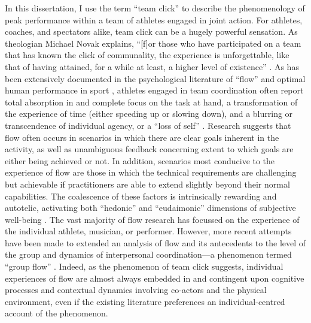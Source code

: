 In this dissertation, I use the term ``team click'' to describe the phenomenology of peak performance within a team of athletes engaged in joint action.  For athletes, coaches, and spectators alike, team click can be a hugely powerful sensation. As theologian Michael Novak explains, ``[f]or those who have participated on a team that has known the click of communality, the experience is unforgettable, like that of having attained, for a while at least, a higher level of existence'' \citep[11]{White2011}. As has been extensively documented in the psychological literature of ``flow'' \citep{Csikszentmihalyi1992} and optimal human performance in sport \citep{Jackson1999}, athletes engaged in team coordination often report total absorption in and complete focus on the task at hand, a transformation of the experience of time (either speeding up or slowing down), and a blurring or transcendence of individual agency, or a ``loss of self''   \citep{Csikszentmihalyi1992,Jackson1995,Jackson1999,McNeill1995}.  Research suggests that flow often occurs in scenarios in which there are clear goals inherent in the activity, as well as unambiguous feedback concerning extent to which goals are either being achieved or not.
In addition, scenarios most conducive to the experience of flow are those in which the technical requirements are challenging but achievable if practitioners are able to extend slightly beyond their normal capabilities\citep{Fong2015}.
The coalescence of these factors is intrinsically rewarding and autotelic\citep{Csikszentmihalyi1975}, activating both ``hedonic'' and ``eudaimonic'' dimensions of subjective well-being \citep{Huta2010,Fave2009}.  The vast majority of flow research has focussed on the experience of the individual athlete, musician, or performer.  However, more recent attempts have been made to extended an analysis of flow and its antecedents to the level of the group and dynamics of interpersonal coordination---a phenomenon termed ``group flow'' \citep{Sawyer2006}. Indeed, as the phenomenon of team click suggests, individual experiences of flow are almost always embedded in and contingent upon cognitive processes and contextual dynamics involving co-actors and the physical environment, even if the existing literature preferences an individual-centred account of the phenomenon\citep{Kirsh2006,Marsh2009,Noy2015}.

